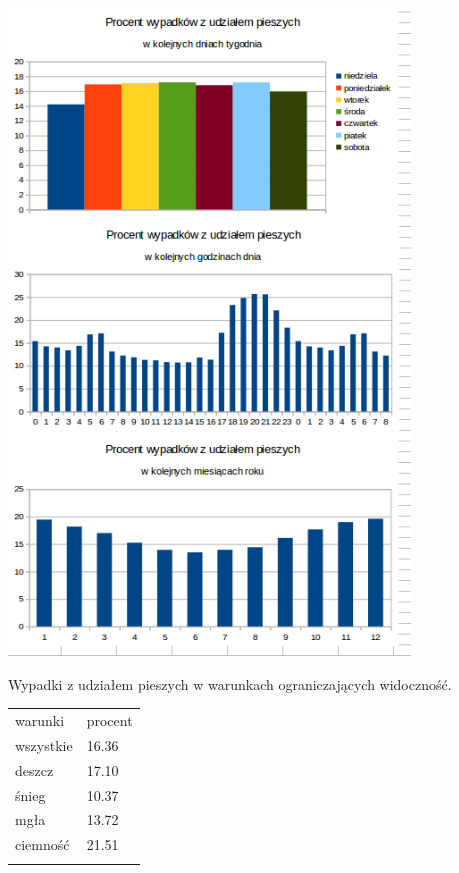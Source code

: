 \centerline{\includegraphics[width=0.8\textwidth]{images/hipotheses/pedestrians/pedestrians.png}}

Wypadki z udziałem pieszych w warunkach ograniczających widoczność.

\begin{longtable}[c]{@{}ll@{}}
\toprule\addlinespace
warunki & procent
\\\addlinespace
\midrule\endhead
wszystkie & 16.36
\\\addlinespace
deszcz & 17.10
\\\addlinespace
śnieg & 10.37
\\\addlinespace
mgła & 13.72
\\\addlinespace
ciemność & 21.51
\\\addlinespace
\bottomrule
\end{longtable}
